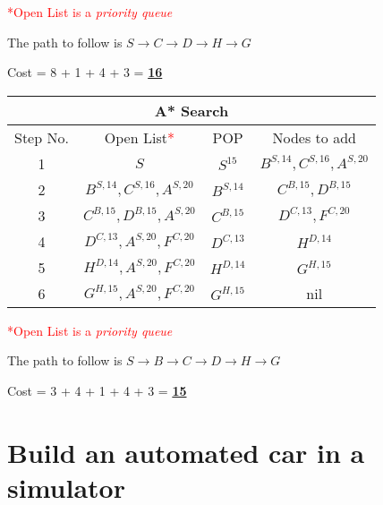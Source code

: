 \documentclass[12pt, letterpaper]{article}
\begin{document}
\textcolor{red}{*Open List is a \textit{priority queue}}

The path to follow is $S\rightarrow C\rightarrow D\rightarrow H\rightarrow G$

Cost = 8 + 1 + 4 + 3 = \underline{\textbf{16}}

\begin{center}
    \begin{tabular}{|c|c|c|c|}
    \hline
    \multicolumn{4}{|c|}{A* Search}\\
    \hline
    Step No. & Open List\textcolor{red}{*} & POP & Nodes to add \\ 
    \hline
    1 & $S$ & $S^{15}$ & $B^{S,14}, C^{S,16}, A^{S,20}$ \\
    \hline
    2 & $B^{S,14}, C^{S,16}, A^{S,20}$ & $B^{S,14}$ & $C^{B,15}, D^{B,15}$ \\
    \hline
    3 & $C^{B,15}, D^{B,15}, A^{S,20}$ & $C^{B,15}$ & $D^{C,13},F^{C,20}$ \\
    \hline
    4 & $D^{C,13}, A^{S,20}, F^{C,20}$ & $D^{C,13}$ & $H^{D,14}$\\
    \hline
    5 & $H^{D,14}, A^{S,20}, F^{C,20}$ & $H^{D,14}$ & $G^{H,15}$\\
    \hline
    6 & $G^{H,15}, A^{S,20}, F^{C,20}$ & $G^{H,15}$ & nil\\
    \hline
    \end{tabular}
\end{center}

\textcolor{red}{*Open List is a \textit{priority queue}}

The path to follow is $S\rightarrow B\rightarrow C\rightarrow D\rightarrow H\rightarrow G$

Cost = 3 + 4 + 1 + 4 + 3 = \underline{\textbf{15}}

\section{Build an automated car in a simulator}
\end{document}
